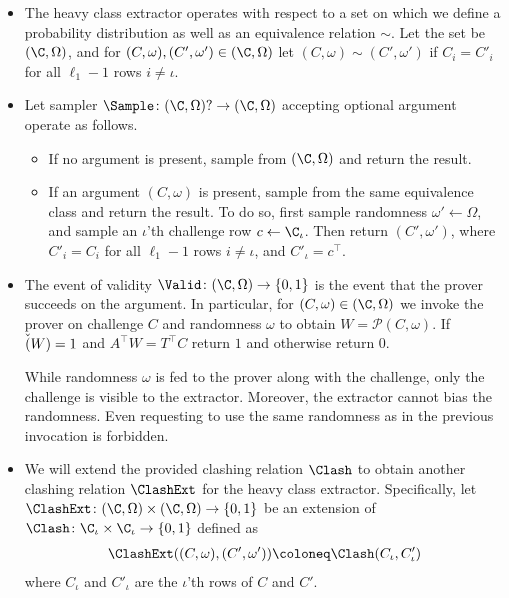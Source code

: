 \begin{itemize}
    \item
    The heavy class extractor operates with respect to a set on which we define a probability distribution as well as an equivalence relation $\sim$.
    Let the set be $(\C,\Omega)$, and for $(C,\omega),(C',\omega')\in(\C,\Omega)$ let $(C,\omega)\sim(C',\omega')$ if $C_i = C'_i$ for all $\ell_1-1$ rows $i\neq\iota$.

    \item
    Let sampler $\Sample\colon(\C,\Omega)?\to(\C,\Omega)$ accepting optional argument operate as follows.
    \begin{itemize}
        \item
        If no argument is present, sample from $(\C,\Omega)$ and return the result.
        \item
        If an argument $(C,\omega)$ is present, sample from the same equivalence class and return the result.
        To do so, first sample randomness $\omega'\leftarrow\Omega$, and sample an $\iota$'th challenge row $c\leftarrow\C_\iota$.
        Then return $(C',\omega')$, where $C'_i=C_i$ for all $\ell_1-1$ rows $i\neq\iota$, and $C'_\iota=c^\intercal$. 
    \end{itemize}

    \item
    The event of validity $\Valid\colon(\C,\Omega)\to\{0,1\}$ is the event that the prover succeeds on the argument.
    In particular, for $(C,\omega)\in(\C,\Omega)$ we invoke the prover on challenge $C$ and randomness $\omega$ to obtain $W = \mathcal{P}(C,\omega)$.
    If $\Check(W)=1$ and $A^\intercal W = T^\intercal C$ return $1$ and otherwise return $0$.

    While randomness $\omega$ is fed to the prover along with the challenge, only the challenge is visible to the extractor.
    Moreover, the extractor cannot bias the randomness.
    Even requesting to use the same randomness as in the previous invocation is forbidden.

    \item
    We will extend the provided clashing relation $\Clash$ to obtain another clashing relation $\ClashExt$ for the heavy class extractor.
    Specifically, let $\ClashExt\colon(\C,\Omega)\times(\C,\Omega)\to\{0,1\}$ be an extension of $\Clash\colon\C_\iota\times\C_\iota\to\{0,1\}$ defined as
    \begin{align}
        \ClashExt((C,\omega),(C',\omega')) \coloneq \Clash(C_\iota,C'_\iota)
    \end{align}
    where $C_\iota$ and $C'_\iota$ are the $\iota$'th rows of $C$ and $C'$.
\end{itemize}

